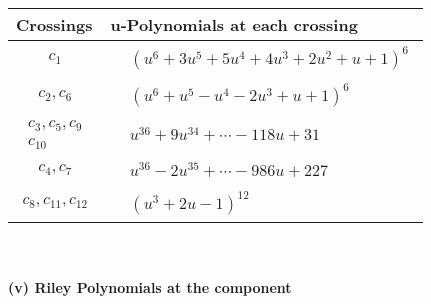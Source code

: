\documentclass[1p]{elsarticle_modified}
\theoremstyle{definition}
\begin{document}
\begin{tabular}{m{50pt}|m{274pt}}
Crossings & \hspace{64pt}u-Polynomials at each crossing \\
\hline $$\begin{aligned}c_{1}\end{aligned}$$&$\begin{aligned}
&(u^6+3 u^5+5 u^4+4 u^3+2 u^2+u+1)^6
\end{aligned}$\\
\hline $$\begin{aligned}c_{2},c_{6}\end{aligned}$$&$\begin{aligned}
&(u^6+u^5- u^4-2 u^3+u+1)^6
\end{aligned}$\\
\hline $$\begin{aligned}c_{3},c_{5},c_{9}\\c_{10}\end{aligned}$$&$\begin{aligned}
&u^{36}+9 u^{34}+\cdots-118 u+31
\end{aligned}$\\
\hline $$\begin{aligned}c_{4},c_{7}\end{aligned}$$&$\begin{aligned}
&u^{36}-2 u^{35}+\cdots-986 u+227
\end{aligned}$\\
\hline $$\begin{aligned}c_{8},c_{11},c_{12}\end{aligned}$$&$\begin{aligned}
&(u^3+2 u-1)^{12}
\end{aligned}$\\
\hline
\end{tabular}\\~\\
\newpage\renewcommand{\arraystretch}{1}
\flushleft \textbf{(v) Riley Polynomials at the component}\newline \\
\end{document}
